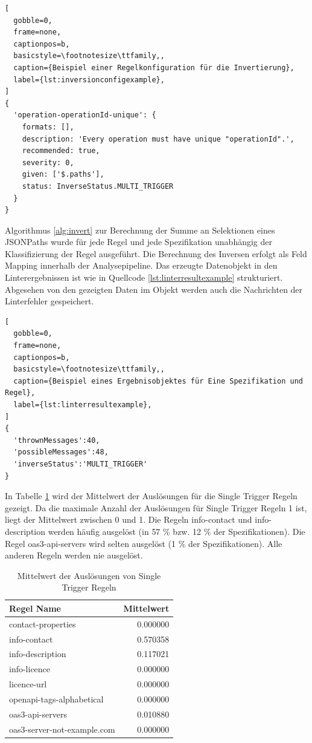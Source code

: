 \lstset{language=JavaScript}
\begin{lstlisting}[
  gobble=0,
  frame=none,
  captionpos=b,
  basicstyle=\footnotesize\ttfamily,,
  caption={Beispiel einer Regelkonfiguration für die Invertierung},
  label={lst:inversionconfigexample},
]
{
  'operation-operationId-unique': {
    formats: [],
    description: 'Every operation must have unique "operationId".',
    recommended: true,
    severity: 0,
    given: ['$.paths'],
    status: InverseStatus.MULTI_TRIGGER
  }
}
\end{lstlisting}

Algorithmus \ref{alg:invert} zur Berechnung der Summe an Selektionen eines JSONPaths wurde für jede Regel und jede Spezifikation unabhängig der Klassifizierung der Regel ausgeführt. Die Berechnung des Inversen erfolgt als Feld Mapping innerhalb der Analysepipeline. Das erzeugte Datenobjekt in den Linterergebnissen ist wie in Quellcode \ref{lst:linterresultexample} strukturiert. Abgesehen von den gezeigten Daten im Objekt werden auch die Nachrichten der Linterfehler gespeichert.

\begin{lstlisting}[
  gobble=0,
  frame=none,
  captionpos=b,
  basicstyle=\footnotesize\ttfamily,,
  caption={Beispiel eines Ergebnisobjektes für Eine Spezifikation und Regel},
  label={lst:linterresultexample},
]
{
  'thrownMessages':40,
  'possibleMessages':48,
  'inverseStatus':'MULTI_TRIGGER'
}
\end{lstlisting}

In Tabelle \ref{tab:singletriggerinverts} wird der Mittelwert der Auslösungen für die Single Trigger Regeln gezeigt. Da die maximale Anzahl der Auslösungen für Single Trigger Regeln 1 ist, liegt der Mittelwert zwischen 0 und 1.  Die Regeln info-contact und info-description werden häufig ausgelöst (in 57 \% bzw. 12 \% der Spezifikationen). Die Regel oas3-api-servers wird selten ausgelöst (1 \% der Spezifikationen). Alle anderen Regeln werden nie ausgelöst. 

\begin{longtable}{lr}
  \caption{Mittelwert der Auslösungen von Single Trigger Regeln}
  \label{tab:singletriggerinverts}
  \endfirsthead
  \endhead
  \textbf{Regel Name} & \textbf{Mittelwert} \\ \hline\hline
  contact-properties & 0.000000 \\ 
  info-contact & 0.570358 \\ 
  info-description & 0.117021 \\ 
  info-licence & 0.000000 \\ 
  licence-url & 0.000000 \\ 
  openapi-tags-alphabetical & 0.000000 \\ 
  oas3-api-servers & 0.010880 \\ 
  oas3-server-not-example.com & 0.000000 \\ \hline\hline
\end{longtable}

